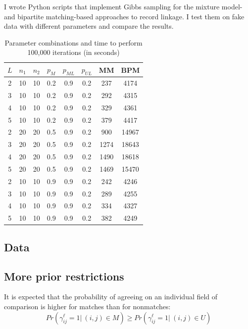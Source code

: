 \documentclass[11pt,reqno]{amsart}
\begin{document}
I wrote Python scripts that implement Gibbs sampling for the mixture model- and bipartite matching-based approaches to record linkage.  I test them on fake data with different parameters and compare the results.
\begin{table}[h!]
\caption{Parameter combinations and time to perform 100,000 iterations (in seconds)}
\begin{center}
\begin{tabular}{cccccc|cc}
\toprule
 $L$ &  $n_1$ &  $n_2$ &  $p_M$ &  $p_{ML}$ &  $p_{UL}$ & MM & BPM \\
\midrule
 2 &  10 &  10 &  0.2 &  0.9 &  0.2 & 237 & 4174 \\
 3 &  10 &  10 &  0.2 &  0.9 &  0.2 & 292 & 4315 \\
 4 &  10 &  10 &  0.2 &  0.9 &  0.2 & 329 & 4361 \\ 
 5 &  10 &  10 &  0.2 &  0.9 &  0.2 & 379 & 4417 \\ 
 2 &  20 &  20 &  0.5 &  0.9 &  0.2 &  900 & 14967 \\ 
 3 &  20 &  20 &  0.5 &  0.9 &  0.2 & 1274 & 18643 \\ 
 4 &  20 &  20 &  0.5 &  0.9 &  0.2 & 1490 & 18618\\
 5 &  20 &  20 &  0.5 &  0.9 &  0.2 & 1469 & 15470 \\
 2 &  10 &  10 &  0.9 &  0.9 &  0.2 &  242 & 4246 \\
 3 &  10 &  10 &  0.9 &  0.9 &  0.2 & 289 & 4255 \\
 4 &  10 &  10 &  0.9 &  0.9 &  0.2 & 334 & 4327 \\
 5 &  10 &  10 &  0.9 &  0.9 &  0.2 & 382 & 4249 \\
\bottomrule
\end{tabular}
\end{center}
\label{default}
\end{table}%

\subsection{Data}

\subsection{More prior restrictions}

It is expected that the probability of agreeing on an individual field of comparison is higher for matches than for nonmatches:
$$Pr\left(\gamma_{ij}^{\ell} = 1 |\ (i,j)\in M\right) \geq Pr\left(\gamma_{ij}^{\ell} = 1 |\ (i,j) \in U\right) $$ 
\end{document}
